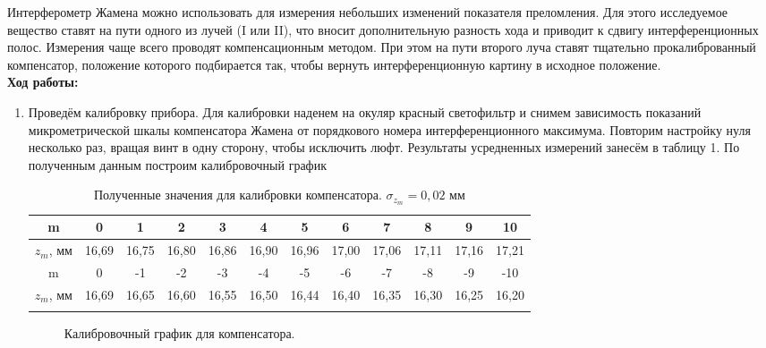 \documentclass[a4paper, 12pt]{article}%
\begin{document}
	Интерферометр Жамена можно использовать для измерения небольших изменений показателя преломления. Для этого исследуемое вещество ставят на пути одного из лучей (I или II), что вносит дополнительную разность хода и приводит к сдвигу интерференционных полос. Измерения чаще всего проводят компенсационным методом. При этом на
	пути второго луча ставят тщательно прокалиброванный компенсатор,
	положение которого подбирается так, чтобы вернуть интерференционную картину в исходное положение.\\
	
	
	\textbf{Ход работы: }\\
	
	\begin{enumerate}
		\item Проведём калибровку прибора. Для калибровки наденем на окуляр красный светофильтр и снимем зависимость показаний микрометрической шкалы компенсатора Жамена от порядкового номера интерференционного максимума. Повторим настройку нуля несколько раз, вращая винт в одну сторону, чтобы исключить люфт. Результаты усредненных измерений занесём в таблицу 1. По полученным данным построим калибровочный график\\
		
		\begin{longtable}{|c|c|c|c|c|c|c|c|c|c|c|c|}
			\hline
			m & 0 & 1 & 2 & 3 & 4 & 5 & 6 & 7 & 8 & 9 & 10 \\ \hline
			$z_m$, мм & 16,69 & 16,75 & 16,80 & 16,86 & 16,90 & 16,96 & 17,00 & 17,06 & 17,11 & 17,16 & 17,21 \\

		\hline
		\hline
		
		m & 0 & -1 & -2 & -3 & -4 & -5 & -6 & -7 & -8 & -9 & -10 \\ \hline
		$z_m$, мм & 16,69 & 16,65 & 16,60 & 16,55 & 16,50 & 16,44 & 16,40 & 16,35 & 16,30 & 16,25 & 16,20 \\ \hline
		\caption{Полученные значения для калибровки компенсатора. $\sigma_{z_m} = 0,02$ мм}
	\end{longtable}

		\begin{figure}[H]
			\caption{Калибровочный график для компенсатора.}
		\end{figure}
		

\end{enumerate}
\end{document}
